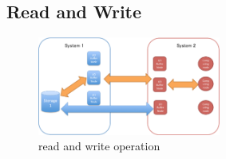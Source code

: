 \documentclass[JIP,draft]{ipsj}
\begin{document}





\subsection{Read and Write}

\begin{figure}[tb]
	\centering
	\includegraphics[width=6cm]{read_and_write}
	\caption{read and write operation}
	\label{read and write}
\end{figure}
\end{document}
